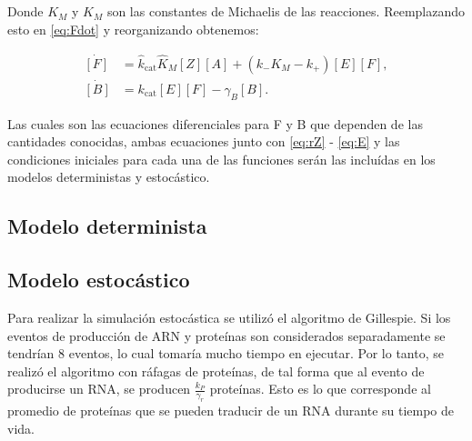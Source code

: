 \documentclass[12pt]{article}
\begin{document}
Donde $K_M$ y $\hat{K}_M$ son las constantes de Michaelis de las reacciones. Reemplazando esto en \ref{eq:Fdot} y reorganizando obtenemos:

\begin{align}
\dot{[F]}&=\hat{k}_{\text{cat}}\hat{K}_M[Z][A]+(k_-K_M-k_+)[E][F], \label{eq:F}\\
\dot{[B]}&=k_{\text{cat}}[E][F]-\gamma_B[B]. \label{eq:B}
\end{align}

Las cuales son las ecuaciones diferenciales para F y B que dependen de las cantidades conocidas, ambas ecuaciones junto con \ref{eq:rZ} - \ref{eq:E} y las condiciones iniciales para cada una de las funciones ser\'an las inclu\'idas en los modelos deterministas y estoc\'astico.

\subsection{Modelo determinista}


\subsection{Modelo estoc\'astico}
Para realizar la simulaci\'on estoc\'astica se utiliz\'o el algoritmo de Gillespie. Si los eventos de producci\'on de ARN y prote\'inas son considerados separadamente se tendr\'ian 8 eventos, lo cual tomar\'ia mucho tiempo en ejecutar. Por lo tanto, se realiz\'o el algoritmo con r\'afagas de prote\'inas, de tal forma que al evento de producirse un RNA, se producen $\frac{k_P}{\gamma_r}$ prote\'inas. Esto es lo que corresponde al promedio de prote\'inas que se pueden traducir de un RNA durante su tiempo de vida.



\end{document}
